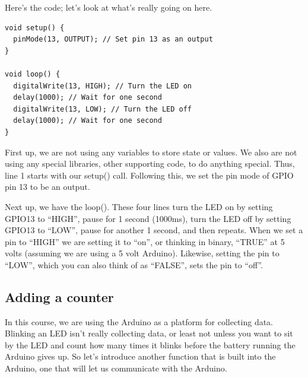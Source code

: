 \documentclass[11pt]{book}
\begin{document}
Here's the code; let's look at what's really going on here.

\begin{minipage}{\linewidth}
\begin{lstlisting}[style=myArduino]
void setup() {
  pinMode(13, OUTPUT); // Set pin 13 as an output
}

void loop() {
  digitalWrite(13, HIGH); // Turn the LED on
  delay(1000); // Wait for one second
  digitalWrite(13, LOW); // Turn the LED off
  delay(1000); // Wait for one second
}
\end{lstlisting}
\end{minipage}

First up, we are not using any variables to store state or values.  We also are not using any special libraries, other supporting code, to do anything special.  Thus, line 1 starts with our setup() call.  Following this, we set the pin mode of GPIO pin 13 to be an output.

Next up, we have the loop().  These four lines turn the LED on by setting GPIO13 to ``HIGH'', pause for 1 second (1000ms), turn the LED off by setting GPIO13 to ``LOW'', pause for another 1 second, and then repeats. When we set a pin to ``HIGH'' we are setting it to ``on'', or thinking in binary, ``TRUE'' at 5 volts (assuming we are using a 5 volt Arduino).  Likewise, setting the pin to ``LOW'', which you can also think of as ``FALSE'', sets the pin to ``off''.


\subsection{Adding a counter}
In this course, we are using the Arduino as a platform for collecting data.  Blinking an LED isn't really collecting data, or least not unless you want to sit by the LED and count how many times it blinks before the battery running the Arduino gives up.  So let's introduce another function that is built into the Arduino, one that will let us communicate with the Arduino.
\end{document}

